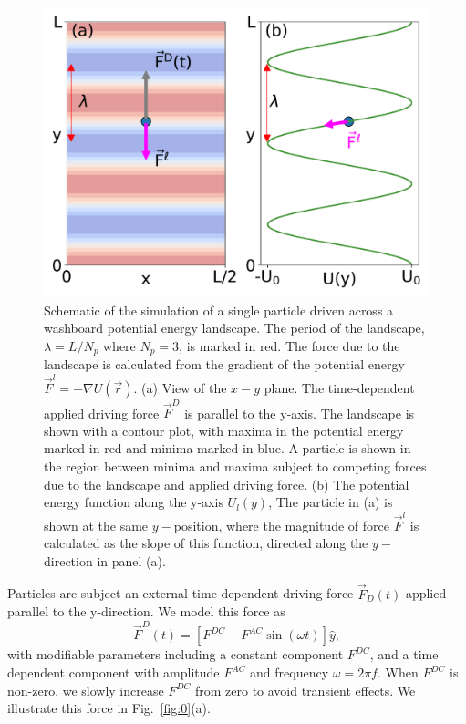 \documentclass[twocolumn,preprintnumbers,amsmath,amssymb,aps,prx]{revtex4}
\begin{document}
\begin{center}
\begin{figure}[h!]
\centering
\includegraphics[width=\columnwidth]{landscape.pdf}
\caption{
  Schematic of the simulation
  of a single particle
  driven across a washboard potential
  energy landscape.
  The period of the landscape, $\lambda = L/N_p$ 
  where $N_p = 3$, is marked in red.
  The force due to the landscape %
  is calculated from the gradient of the potential
  energy 
  $\vec{F}^l = -\nabla U(\vec{r})$.
  (a) View of the $x-y$ plane. %
  The time-dependent applied driving force $\vec{F}^D$
  is parallel to the y-axis.
  The landscape is shown with a contour plot,
  with maxima in the potential energy marked in red
  and minima marked in blue.
  A particle is shown in the region between minima and maxima
  subject to competing forces due to the landscape and applied driving force.
  (b) The potential energy function
  along the y-axis $U_l(y)$,
  The particle in (a) is shown at the same $y-$position,
  where the magnitude of force $\vec{F}^l$ is calculated as the slope of this function,
  directed along the $y-$direction in panel (a).
  }
\label{fig:landscape0}
\end{figure}
\end{center}

 
 Particles are subject an external time-dependent driving force
$\vec{F}_{D}(t)$
applied parallel to the y-direction.
We model this force as
\begin{equation}
  \vec{F}^{D}(t) = [F^{DC} + F^{AC} \sin(\omega t)] \hat{y},
    \label{eq:drive}
\end{equation}
with modifiable parameters including
a constant component $F^{DC}$,
and a time dependent component with amplitude $F^{AC}$
and frequency $\omega = 2 \pi f$.
When $F^{DC}$ is non-zero,  
we slowly increase 
$F^{DC}$ from zero
to avoid transient effects.
We illustrate this force in Fig.~\ref{fig:0}(a).
\end{document}
